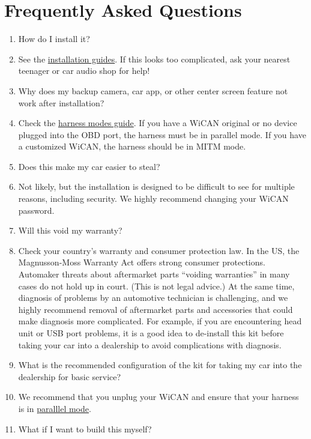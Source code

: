 \documentclass[superscriptaddress,onecolumn,floatfix]{revtex4-2}
\begin{document}
\section{Frequently Asked Questions}
\begin{enumerate}
  \item[Q:] How do I install it?
  \item[A:] See the \href{https://github.com/tylerharvey/Ioniq5_CAN/blob/main/guides/}{installation guides}. If this looks too complicated, ask your nearest teenager or car audio shop for help!
  \item[Q:] Why does my backup camera, car app, or other center screen feature not work after installation?
  \item[A:] Check the \href{https://github.com/tylerharvey/Ioniq5_CAN/blob/main/guides/harnesses/head_unit_MITM/MITM_harness_modes.pdf}{harness modes guide}. If you have a WiCAN original or no device plugged into the OBD port, the harness must be in parallel mode. If you have a customized WiCAN, the harness should be in MITM mode.
  \item[Q:] Does this make my car easier to steal?
  \item[A:] Not likely, but the installation is designed to be difficult to see for multiple reasons, including security. We highly recommend changing your WiCAN password. 
  \item[Q:] Will this void my warranty?
  \item[A:] Check your country's warranty and consumer protection law. In the US, the Magnusson-Moss Warranty Act offers strong consumer protections. Automaker threats about aftermarket parts ``voiding warranties'' in many cases do not hold up in court. (This is not legal advice.) At the same time, diagnosis of problems by an automotive technician is challenging, and we highly recommend removal of aftermarket parts and accessories that could make diagnosis more complicated. For example, if you are encountering head unit or USB port problems, it is a good idea to de-install this kit before taking your car into a dealership to avoid complications with diagnosis. 
  \item[Q:] What is the recommended configuration of the kit for taking my car into the dealership for basic service?
  \item[A:] We recommend that you unplug your WiCAN and ensure that your harness is in \href{https://github.com/tylerharvey/Ioniq5_CAN/blob/main/guides/harnesses/head_unit_MITM/MITM_harness_modes.pdf}{paralllel mode}.
  \item[Q:] What if I want to build this myself?

\end{enumerate}
\end{document}
